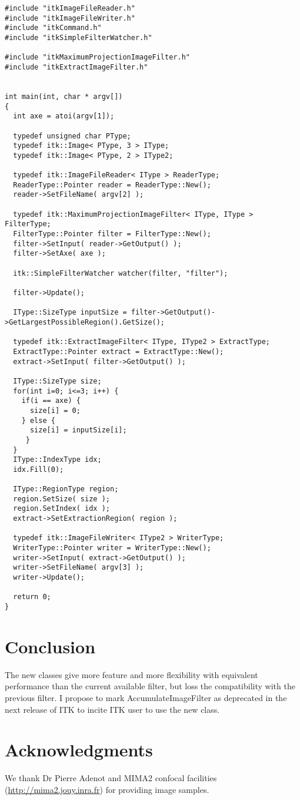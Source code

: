 \documentclass{InsightArticle}
\begin{document}
\small \begin{verbatim}
#include "itkImageFileReader.h"
#include "itkImageFileWriter.h"
#include "itkCommand.h"
#include "itkSimpleFilterWatcher.h"

#include "itkMaximumProjectionImageFilter.h"
#include "itkExtractImageFilter.h"


int main(int, char * argv[])
{
  int axe = atoi(argv[1]);

  typedef unsigned char PType;
  typedef itk::Image< PType, 3 > IType;
  typedef itk::Image< PType, 2 > IType2;

  typedef itk::ImageFileReader< IType > ReaderType;
  ReaderType::Pointer reader = ReaderType::New();
  reader->SetFileName( argv[2] );

  typedef itk::MaximumProjectionImageFilter< IType, IType > FilterType;
  FilterType::Pointer filter = FilterType::New();
  filter->SetInput( reader->GetOutput() );
  filter->SetAxe( axe );

  itk::SimpleFilterWatcher watcher(filter, "filter");

  filter->Update();

  IType::SizeType inputSize = filter->GetOutput()->GetLargestPossibleRegion().GetSize();

  typedef itk::ExtractImageFilter< IType, IType2 > ExtractType;
  ExtractType::Pointer extract = ExtractType::New();
  extract->SetInput( filter->GetOutput() );

  IType::SizeType size;
  for(int i=0; i<=3; i++) {
    if(i == axe) {
      size[i] = 0;
    } else {
      size[i] = inputSize[i];
     }
  }
  IType::IndexType idx;
  idx.Fill(0);

  IType::RegionType region;
  region.SetSize( size );
  region.SetIndex( idx );
  extract->SetExtractionRegion( region );

  typedef itk::ImageFileWriter< IType2 > WriterType;
  WriterType::Pointer writer = WriterType::New();
  writer->SetInput( extract->GetOutput() );
  writer->SetFileName( argv[3] );
  writer->Update();

  return 0;
}
\end{verbatim} \normalsize

\section{Conclusion}
The new classes give more feature and more flexibility with equivalent
performance than the current available filter, but loss the compatibility with
the previous filter. I propose to mark AccumulateImageFilter as deprecated in
the next release of ITK to incite ITK user to use the new class.


\section{Acknowledgments}
We thank Dr Pierre Adenot and MIMA2 confocal facilities
(\url{http://mima2.jouy.inra.fr})
for providing image samples.


\appendix





\nocite{ITKSoftwareGuide}
\end{document}
